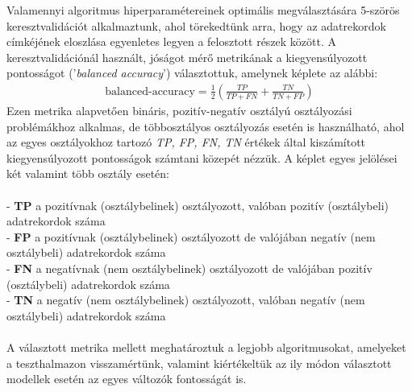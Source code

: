 \documentclass[12pt]{article}
\begin{document}
\newpage
Valamennyi algoritmus hiperparamétereinek optimális megválasztására 5-szörös keresztvalidációt alkalmaztunk, ahol törekedtünk arra, hogy az adatrekordok címkéjének eloszlása egyenletes legyen a felosztott részek között. A keresztvalidációnál használt, jóságot mérő metrikának a kiegyensúlyozott pontosságot ('\textit{balanced accuracy}') választottuk, amelynek képlete az alábbi:
\begin{align*}
\text{balanced-accuracy} = \frac{1}{2}\left(\frac{TP}{TP+FN} + \frac{TN}{TN+FP} \right) 
\end{align*}Ezen metrika alapvetően bináris, pozitív-negatív osztályú osztályozási problémákhoz alkalmas, de többosztályos osztályozás esetén is használható, ahol az egyes osztályokhoz tartozó \textit{TP, FP, FN, TN} értékek által kiszámított kiegyensúlyozott pontosságok számtani közepét nézzük. A képlet egyes jelölései két valamint több osztály esetén:  \\ \\
- \textbf{TP} a pozitívnak (osztálybelinek) osztályozott, valóban pozitív (osztálybeli) adatrekordok száma \\
- \textbf{FP} a pozitívnak (osztálybelinek) osztályozott de valójában negatív (nem osztálybeli) adatrekordok száma \\
- \textbf{FN} a negatívnak (nem osztálybelinek) osztályozott de valójában pozitív (osztálybeli) adatrekordok száma \\
- \textbf{TN} a negatív (nem osztálybelinek) osztályozott, valóban negatív (nem osztálybeli) adatrekordok száma \\ 
\\
A választott metrika mellett meghatároztuk a legjobb algoritmusokat, amelyeket a teszthalmazon visszamértünk, valamint kiértékeltük az ily módon választott modellek esetén az egyes változók fontosságát is.
\end{document}
